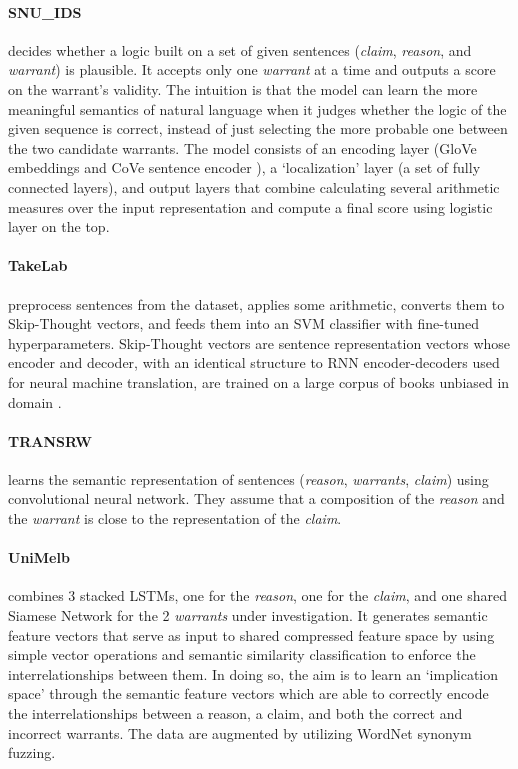 \paragraph{SNU\_IDS}
decides whether a logic built on a set of given sentences (\emph{claim}, \emph{reason}, and \emph{warrant}) is plausible. It accepts only one \emph{warrant} at a time and outputs a score on the warrant's validity. The intuition is that the model can learn the more meaningful semantics of natural language when it judges whether the logic of the given sequence is correct, instead of just selecting the more probable one between the two candidate warrants. The model consists of an encoding layer (GloVe embeddings \cite{Pennington.2014} and CoVe sentence encoder \cite{McCann.et.al.2017.NIPS}), a `localization' layer (a set of fully connected layers), and output layers that combine calculating several arithmetic measures over the input representation and compute a final score using logistic layer on the top.


\paragraph{TakeLab}
preprocess sentences from the dataset, applies some arithmetic, converts them to Skip-Thought vectors, and feeds them into an SVM classifier with fine-tuned hyperparameters. Skip-Thought vectors are sentence representation vectors whose encoder and decoder, with an identical structure to RNN encoder-decoders used for neural machine translation, are trained on a large corpus of books unbiased in domain \cite{Kiros.et.al.2015}.


\paragraph{TRANSRW}
learns the semantic representation of sentences (\emph{reason}, \emph{warrants}, \emph{claim}) using convolutional neural network. They assume that a composition of the \emph{reason} and the \emph{warrant} is close to the representation of the \emph{claim}.


\paragraph{UniMelb}
combines 3 stacked LSTMs, one for the \emph{reason}, one for the \emph{claim}, and one shared Siamese Network for the 2 \emph{warrants} under investigation. It generates semantic feature vectors that serve as input to shared compressed feature space by using simple vector operations and semantic similarity classification to enforce the interrelationships between them. In doing so, the aim is to learn an `implication space' through the semantic feature vectors which are able to correctly encode the interrelationships between a reason, a claim, and both the correct and incorrect warrants. The data are augmented by utilizing WordNet synonym fuzzing.


